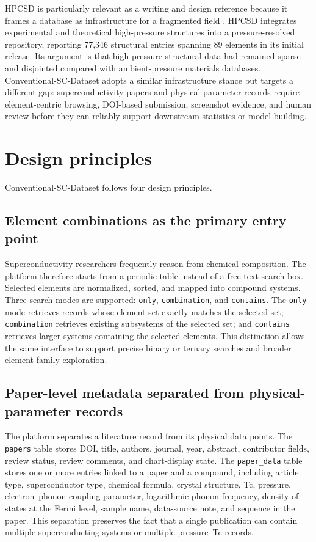 \documentclass[11pt,a4paper]{article}
\begin{document}
HPCSD is particularly relevant as a writing and design reference because it frames a database as infrastructure for a fragmented field \cite{wang2026hpcsd}. HPCSD integrates experimental and theoretical high-pressure structures into a pressure-resolved repository, reporting 77,346 structural entries spanning 89 elements in its initial release. Its argument is that high-pressure structural data had remained sparse and disjointed compared with ambient-pressure materials databases. Conventional-SC-Dataset adopts a similar infrastructure stance but targets a different gap: superconductivity papers and physical-parameter records require element-centric browsing, DOI-based submission, screenshot evidence, and human review before they can reliably support downstream statistics or model-building.

\section{Design principles}

Conventional-SC-Dataset follows four design principles.

\subsection{Element combinations as the primary entry point}

Superconductivity researchers frequently reason from chemical composition. The platform therefore starts from a periodic table instead of a free-text search box. Selected elements are normalized, sorted, and mapped into compound systems. Three search modes are supported: \texttt{only}, \texttt{combination}, and \texttt{contains}. The \texttt{only} mode retrieves records whose element set exactly matches the selected set; \texttt{combination} retrieves existing subsystems of the selected set; and \texttt{contains} retrieves larger systems containing the selected elements. This distinction allows the same interface to support precise binary or ternary searches and broader element-family exploration.

\subsection{Paper-level metadata separated from physical-parameter records}

The platform separates a literature record from its physical data points. The \texttt{papers} table stores DOI, title, authors, journal, year, abstract, contributor fields, review status, review comments, and chart-display state. The \texttt{paper\_data} table stores one or more entries linked to a paper and a compound, including article type, superconductor type, chemical formula, crystal structure, Tc, pressure, electron--phonon coupling parameter, logarithmic phonon frequency, density of states at the Fermi level, sample name, data-source note, and sequence in the paper. This separation preserves the fact that a single publication can contain multiple superconducting systems or multiple pressure--Tc records.
\end{document}
